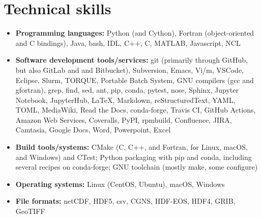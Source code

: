 \section{Technical skills}
\vspace{0.5em}

\begin{itemize}

  \item \textbf{Programming languages:} Python (and Cython),
    Fortran (object-oriented and C bindings), Java, bash,
    IDL, C++, C, MATLAB, Javascript, NCL

  \item \textbf{Software development tools/services:} git (primarily through
    GitHub, but also GitLab and and Bitbucket), Subversion, Emacs,
    Vi/m, VSCode, Eclipse, Slurm, TORQUE, Portable Batch System,
    GNU compilers (gcc and gfortran), grep, find, sed,
    ant, pip, conda, pytest, nose, Sphinx, Jupyter Notebook, JupyterHub, \LaTeX,
    Markdown, reStructuredText, YAML, TOML, MediaWiki, Read the Docs,
    conda-forge, {Travis CI}, {GitHub Actions}, {Amazon Web Services},
    Coveralls, PyPI, rpmbuild, Confluence, JIRA, Camtasia, Google Docs, Word,
    Powerpoint, Excel

  \item \textbf{Build tools/systems:} CMake (C, C++, and Fortran, for Linux, macOS,
    and Windows) and CTest; Python packaging with pip and conda, including
    several recipes on conda-forge; GNU toolchain (mostly make, some configure)

  \item \textbf{Operating systems:} Linux (CentOS, Ubuntu), macOS, Windows

  \item \textbf{File formats:} netCDF, HDF5, csv, CGNS, HDF-EOS, HDF4, GRIB, GeoTIFF

\end{itemize}
